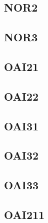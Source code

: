 \documentclass[10pt,a4paper,twoside]{article}
\begin{document}
\subsection{NOR2}

\clearpage

\subsection{NOR3}

\clearpage



\subsection{OAI21}

\clearpage

\subsection{OAI22}

\clearpage

\subsection{OAI31}

\clearpage

\subsection{OAI32}

\clearpage

\subsection{OAI33}

\clearpage

\subsection{OAI211}

\clearpage
\end{document}
